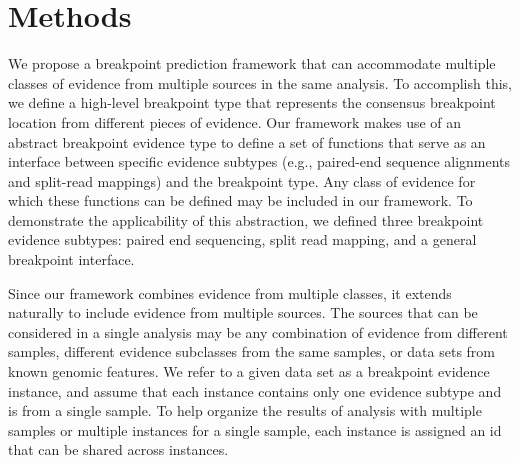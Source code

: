 \documentclass[11pt]{article}
\begin{document}



\section{Methods}

We propose a breakpoint prediction framework that can accommodate multiple
classes of evidence from multiple sources in the same analysis.  To accomplish
this, we define a high-level breakpoint type that represents the consensus
breakpoint location from different pieces of evidence.  Our framework makes use
of an abstract breakpoint evidence type to define a set of functions that serve
as an interface between specific evidence subtypes (e.g., paired-end sequence
alignments and split-read mappings) and the breakpoint type.  Any class of
evidence for which these functions can be defined may be included in our
framework.  To demonstrate the applicability of this abstraction, we defined
three breakpoint evidence subtypes: paired end sequencing, split read mapping,
and a general breakpoint interface. 

Since our framework combines evidence from multiple classes, it extends
naturally to include evidence from multiple sources.  The sources that can be
considered in a single analysis may be any combination of evidence from
different samples, different evidence subclasses from the same samples, or
data sets from known genomic features.  We refer to a given data set as a
breakpoint evidence instance, and assume that each instance contains only one
evidence subtype and is from a single sample.  To help organize the results of
analysis with multiple samples or multiple instances for a single sample,
each instance is assigned an id that can be shared across instances.
\end{document}
